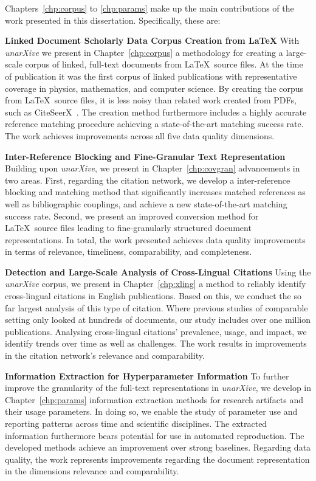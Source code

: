 Chapters~\ref{chp:corpus} to \ref{chp:params} make up the main contributions of the work presented in this dissertation. Specifically, these are:

\textbf{Linked Document Scholarly Data Corpus Creation from \LaTeX} With \emph{unarXive} we present in Chapter~\ref{chp:corpus} a methodology for creating a large-scale corpus of linked, full-text documents from \LaTeX\ source files. At the time of publication it was the first corpus of linked publications with representative coverage in physics, mathematics, and computer science. By creating the corpus from \LaTeX\ source files, it is less noisy than related work created from PDFs, such as CiteSeerX~\cite{Wu2015}. The creation method furthermore includes a highly accurate reference matching procedure achieving a state-of-the-art matching success rate. The work achieves improvements across all five data quality dimensions.

\textbf{Inter-Reference Blocking and Fine-Granular Text Representation} Building upon \emph{unarXive}, we present in Chapter~\ref{chp:covgran} advancements in two areas. First, regarding the citation network, we develop a inter-reference blocking and matching method that significantly increases matched references as well as bibliographic couplings, and achieve a new state-of-the-art matching success rate. Second, we present an improved conversion method for \LaTeX\ source files leading to fine-granularly structured document representations. %
In total, the work presented achieves data quality improvements in terms of relevance, timeliness, comparability, and completeness.

\textbf{Detection and Large-Scale Analysis of Cross-Lingual Citations} Using the \emph{unarXive} corpus, we present in Chapter~\ref{chp:xling} a method to reliably identify cross-lingual citations in English publications. Based on this, we conduct the so far largest analysis of this type of citation. Where previous studies of comparable setting only looked at hundreds of documents, our study includes over one million publications. Analysing cross-lingual citations' prevalence, usage, and impact, we identify trends over time as well as challenges. The work results in improvements in the citation network's relevance and comparability.

\textbf{Information Extraction for Hyperparameter Information} To further improve the granularity of the full-text representations in \emph{unarXive}, we develop in Chapter~\ref{chp:params} information extraction methods for research artifacts and their usage parameters. In doing so, we enable the study of parameter use and reporting patterns across time and scientific disciplines. The extracted information furthermore bears potential for use in automated reproduction. The developed methods achieve an improvement over strong baselines. Regarding data quality, the work represents improvements regarding the document representation in the dimensions relevance and comparability.

